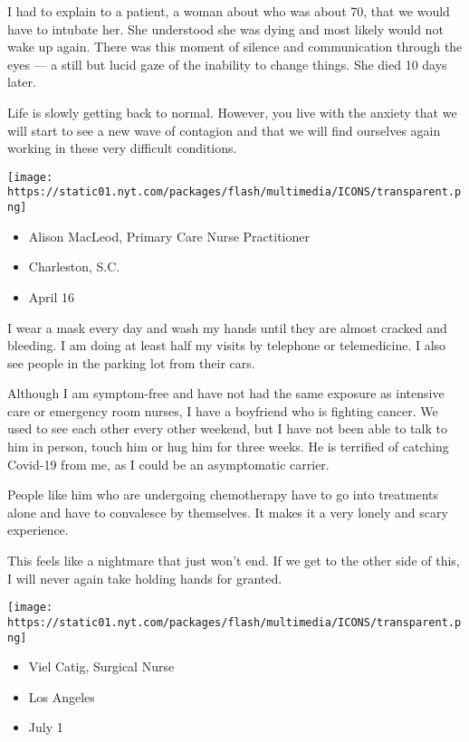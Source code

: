 I had to explain to a patient, a woman about who was about 70, that we
would have to intubate her. She understood she was dying and most likely
would not wake up again. There was this moment of silence and
communication through the eyes --- a still but lucid gaze of the
inability to change things. She died 10 days later.

Life is slowly getting back to normal. However, you live with the
anxiety that we will start to see a new wave of contagion and that we
will find ourselves again working in these very difficult conditions.

\texttt{[image: https://static01.nyt.com/packages/flash/multimedia/ICONS/transparent.png]}

\begin{itemize}
\tightlist
\item
  Alison MacLeod, Primary Care Nurse Practitioner
\item
  Charleston, S.C.
\item
  April 16
\end{itemize}

I wear a mask every day and wash my hands until they are almost cracked
and bleeding. I am doing at least half my visits by telephone or
telemedicine. I also see people in the parking lot from their cars.

Although I am symptom-free and have not had the same exposure as
intensive care or emergency room nurses, I have a boyfriend who is
fighting cancer. We used to see each other every other weekend, but I
have not been able to talk to him in person, touch him or hug him for
three weeks. He is terrified of catching Covid-19 from me, as I could be
an asymptomatic carrier.

People like him who are undergoing chemotherapy have to go into
treatments alone and have to convalesce by themselves. It makes it a
very lonely and scary experience.

This feels like a nightmare that just won't end. If we get to the other
side of this, I will never again take holding hands for granted.

\texttt{[image: https://static01.nyt.com/packages/flash/multimedia/ICONS/transparent.png]}

\begin{itemize}
\tightlist
\item
  Viel Catig, Surgical Nurse
\item
  Los Angeles
\item
  July 1
\end{itemize}

